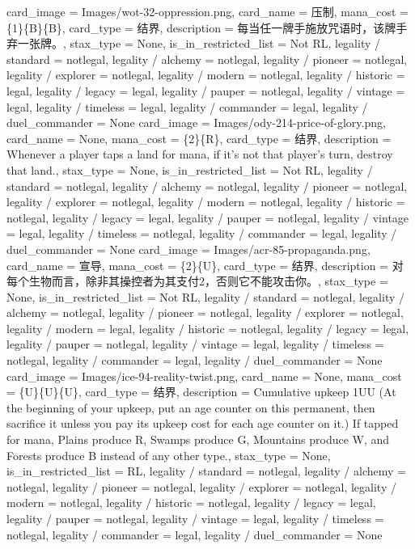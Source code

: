 \documentclass[lang = cn, color = black, 10pt]{AllThatStax}
\begin{document}
\card
{
	card_image = Images/wot-32-oppression.png,
	card_name = 压制,
	mana_cost = \{1\}\{B\}\{B\},
	card_type = 结界,
	description = 每当任一牌手施放咒语时，该牌手弃一张牌。,
	stax_type = None,
	is_in_restricted_list = Not RL,
	legality / standard = notlegal,
	legality / alchemy = notlegal,
	legality / pioneer = notlegal,
	legality / explorer = notlegal,
	legality / modern = notlegal,
	legality / historic = legal,
	legality / legacy = legal,
	legality / pauper = notlegal,
	legality / vintage = legal,
	legality / timeless = legal,
	legality / commander = legal,
	legality / duel_commander = None
}
\card
{
	card_image = Images/ody-214-price-of-glory.png,
	card_name = None,
	mana_cost = \{2\}\{R\},
	card_type = 结界,
	description = Whenever a player taps a land for mana, if it's not that player's turn, destroy that land.,
	stax_type = None,
	is_in_restricted_list = Not RL,
	legality / standard = notlegal,
	legality / alchemy = notlegal,
	legality / pioneer = notlegal,
	legality / explorer = notlegal,
	legality / modern = notlegal,
	legality / historic = notlegal,
	legality / legacy = legal,
	legality / pauper = notlegal,
	legality / vintage = legal,
	legality / timeless = notlegal,
	legality / commander = legal,
	legality / duel_commander = None
}
\card
{
	card_image = Images/acr-85-propaganda.png,
	card_name = 宣导,
	mana_cost = \{2\}\{U\},
	card_type = 结界,
	description = 对每个生物而言，除非其操控者为其支付{2}，否则它不能攻击你。,
	stax_type = None,
	is_in_restricted_list = Not RL,
	legality / standard = notlegal,
	legality / alchemy = notlegal,
	legality / pioneer = notlegal,
	legality / explorer = notlegal,
	legality / modern = legal,
	legality / historic = notlegal,
	legality / legacy = legal,
	legality / pauper = notlegal,
	legality / vintage = legal,
	legality / timeless = notlegal,
	legality / commander = legal,
	legality / duel_commander = None
}
\card
{
	card_image = Images/ice-94-reality-twist.png,
	card_name = None,
	mana_cost = \{U\}\{U\}\{U\},
	card_type = 结界,
	description = Cumulative upkeep {1}{U}{U} (At the beginning of your upkeep, put an age counter on this permanent, then sacrifice it unless you pay its upkeep cost for each age counter on it.)
	If tapped for mana, Plains produce {R}, Swamps produce {G}, Mountains produce {W}, and Forests produce {B} instead of any other type.,
	stax_type = None,
	is_in_restricted_list = RL,
	legality / standard = notlegal,
	legality / alchemy = notlegal,
	legality / pioneer = notlegal,
	legality / explorer = notlegal,
	legality / modern = notlegal,
	legality / historic = notlegal,
	legality / legacy = legal,
	legality / pauper = notlegal,
	legality / vintage = legal,
	legality / timeless = notlegal,
	legality / commander = legal,
	legality / duel_commander = None
}
\end{document}
